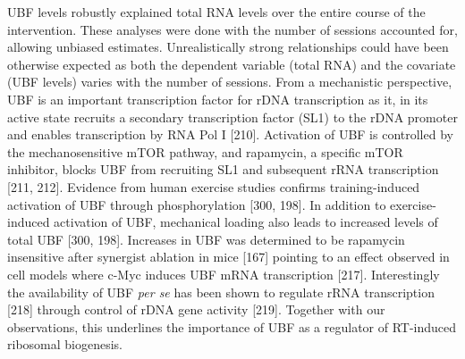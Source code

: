 \documentclass[twoside,10pt]{gihclass} %
\begin{document}
UBF levels robustly explained total RNA levels over the entire course of the intervention. These analyses were done with the number of sessions accounted for, allowing unbiased estimates. Unrealistically strong relationships could have been otherwise expected as both the dependent variable (total RNA) and the covariate (UBF levels) varies with the number of sessions.
From a mechanistic perspective, UBF is an important transcription factor for rDNA transcription as it, in its active state recruits a secondary transcription factor (SL1) to the rDNA promoter and enables transcription by RNA Pol I
{[}210{]}.
Activation of UBF is controlled by the mechanosensitive mTOR pathway, and rapamycin, a specific mTOR inhibitor, blocks UBF from recruiting SL1 and subsequent rRNA transcription
{[}211, 212{]}.
Evidence from human exercise studies confirms training-induced activation of UBF through phosphorylation
{[}300, 198{]}.
In addition to exercise-induced activation of UBF, mechanical loading also leads to increased levels of total UBF
{[}300, 198{]}. Increases in UBF was determined to be rapamycin insensitive after synergist ablation in mice
{[}167{]}
pointing to an effect observed in cell models where c-Myc induces UBF mRNA transcription {[}217{]}.
Interestingly the availability of UBF \emph{per se} has been shown to regulate rRNA transcription
{[}218{]} through control of rDNA gene activity
{[}219{]}.
Together with our observations, this underlines the importance of UBF as a regulator of RT-induced ribosomal biogenesis.
\end{document}
